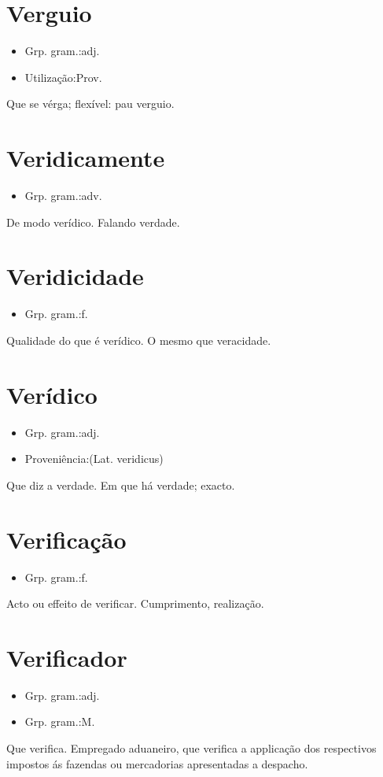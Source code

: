 \documentclass{article}
\begin{document}
\section{Verguio}
\begin{itemize}
\item {Grp. gram.:adj.}
\end{itemize}
\begin{itemize}
\item {Utilização:Prov.}
\end{itemize}
Que se vérga; flexível: \textunderscore pau verguio\textunderscore .
\section{Veridicamente}
\begin{itemize}
\item {Grp. gram.:adv.}
\end{itemize}
De modo verídico.
Falando verdade.
\section{Veridicidade}
\begin{itemize}
\item {Grp. gram.:f.}
\end{itemize}
Qualidade do que é verídico.
O mesmo que \textunderscore veracidade\textunderscore .
\section{Verídico}
\begin{itemize}
\item {Grp. gram.:adj.}
\end{itemize}
\begin{itemize}
\item {Proveniência:(Lat. \textunderscore veridicus\textunderscore )}
\end{itemize}
Que diz a verdade.
Em que há verdade; exacto.
\section{Verificação}
\begin{itemize}
\item {Grp. gram.:f.}
\end{itemize}
Acto ou effeito de verificar.
Cumprimento, realização.
\section{Verificador}
\begin{itemize}
\item {Grp. gram.:adj.}
\end{itemize}
\begin{itemize}
\item {Grp. gram.:M.}
\end{itemize}
Que verifica.
Empregado aduaneiro, que verifica a applicação dos respectivos impostos ás fazendas ou mercadorias apresentadas a despacho.
\end{document}
